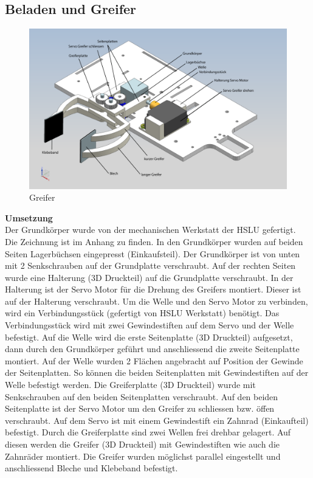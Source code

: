 \newpage
\subsection{Beladen und Greifer}
\begin{figure}[H]
\centering
\includegraphics[width=1\textwidth]{03_Loesungskonzept/pictures/Greifer2.png}
\caption{Greifer}
\end{figure}
\textbf{Umsetzung}\\[0.2cm]
Der Grundkörper wurde von der mechanischen Werkstatt der HSLU gefertigt. Die Zeichnung ist im Anhang zu finden. In den Grundkörper wurden auf beiden Seiten Lagerbüchsen eingepresst (Einkaufsteil). Der Grundkörper ist von unten mit 2 Senkschrauben auf der Grundplatte verschraubt.
Auf der rechten Seiten wurde eine Halterung (3D Druckteil) auf die Grundplatte verschraubt. In der Halterung ist der Servo Motor für die Drehung des Greifers montiert. Dieser ist auf der Halterung verschraubt. Um die Welle und den Servo Motor zu verbinden, wird ein Verbindungsstück (gefertigt von HSLU Werkstatt) benötigt. Das Verbindungsstück wird mit zwei Gewindestiften auf dem Servo und der Welle befestigt. Auf die Welle wird die erste Seitenplatte (3D Druckteil) aufgesetzt, dann durch den Grundkörper geführt und anschliessend die zweite Seitenplatte montiert. Auf der Welle wurden 2 Flächen angebracht auf Position der Gewinde der Seitenplatten. So können die beiden Seitenplatten mit Gewindestiften auf der Welle befestigt werden. Die Greiferplatte (3D Druckteil) wurde mit Senkschrauben auf den beiden Seitenplatten verschraubt. 
Auf den beiden Seitenplatte ist der Servo Motor um den Greifer zu schliessen bzw. öffen verschraubt. Auf dem Servo ist mit einem Gewindestift ein Zahnrad (Einkaufteil) befestigt. Durch die Greiferplatte sind zwei Wellen frei drehbar gelagert. Auf diesen werden die Greifer (3D Druckteil) mit Gewindestiften wie auch die Zahnräder montiert. Die Greifer wurden möglichst parallel eingestellt und anschliessend Bleche und Klebeband befestigt.
